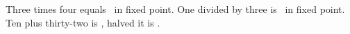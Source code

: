 \documentclass{article}
\begin{document}
Three times four equals \result\ in fixed point.
One divided by three is \third\ in fixed point.
Ten plus thirty-two is \sum, halved it is \avg.
\end{document}
